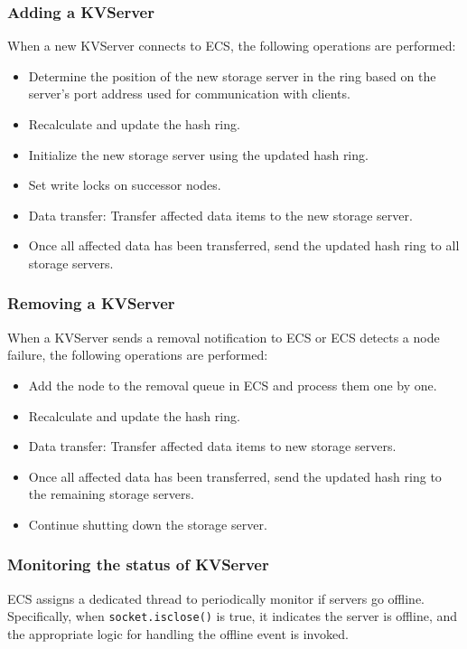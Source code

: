 \documentclass[sigconf]{acmart}
\begin{document}
\subsubsection{Adding a KVServer}
When a new KVServer connects to ECS, the following operations are performed:
\begin{itemize}
    \item Determine the position of the new storage server in the ring based on the server's port address used for communication with clients.
    \item Recalculate and update the hash ring.
    \item Initialize the new storage server using the updated hash ring.
    \item Set write locks on successor nodes.
    \item Data transfer: Transfer affected data items to the new storage server.
    \item Once all affected data has been transferred, send the updated hash ring to all storage servers.
\end{itemize}

\subsubsection{Removing a KVServer}
When a KVServer sends a removal notification to ECS or ECS detects a node failure, the following operations are performed:
\begin{itemize}
    \item Add the node to the removal queue in ECS and process them one by one.
    \item Recalculate and update the hash ring.
    \item Data transfer: Transfer affected data items to new storage servers.
    \item Once all affected data has been transferred, send the updated hash ring to the remaining storage servers.
    \item Continue shutting down the storage server.
\end{itemize}

\subsubsection{Monitoring the status of KVServer}
ECS assigns a dedicated thread to periodically monitor if servers go offline. Specifically, when \texttt{socket.isclose()} is true, it indicates the server is offline, and the appropriate logic for handling the offline event is invoked.
\end{document}
